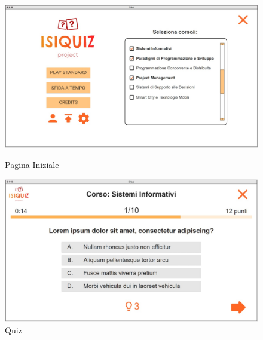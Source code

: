         \begin{figure}[H]
          \centering
          \begin{minipage}[b]{0.48\textwidth}
            \includegraphics[width=\textwidth]{Images/mockup/home2.jpg}
            \caption{Pagina Iniziale}
            \label{fig:HomePage2}
          \end{minipage}
          \hfill
          \begin{minipage}[b]{0.48\textwidth}
            \includegraphics[width=\textwidth]{Images/mockup/quiz2.jpg}
            \caption{Quiz}
            \label{fig:Quiz2}
          \end{minipage}
        \end{figure}
          
